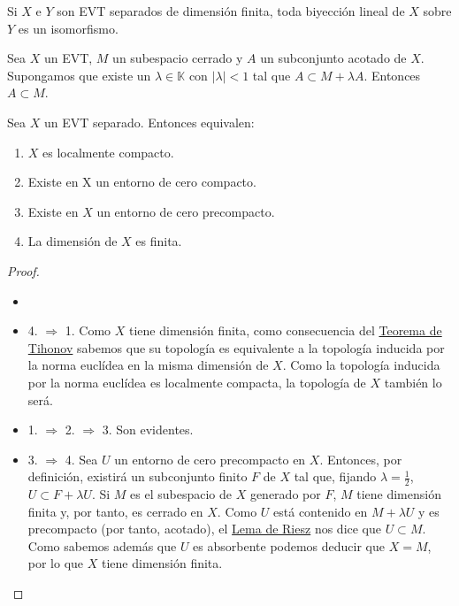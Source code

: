 \begin{teorema}\label{thm:d05}
Si $X$ e $Y$ son EVT separados de dimensión finita, toda biyección lineal de $X$ sobre $Y$ es un isomorfismo. 
\end{teorema}

\begin{lema}\label{lm:d01}
Sea $X$ un EVT, $M$ un subespacio cerrado y $A$ un subconjunto acotado de $X$. Supongamos que existe un $\lambda\in \mathds{K}$ con $|\lambda| <1$ tal que $A\subset M + \lambda A$. Entonces $A\subset M$. 
\end{lema}
\begin{teorema}\label{thm:d04}
Sea $X$ un EVT separado. Entonces equivalen:
\begin{enumerate}


\item $X$ es localmente compacto.
\item Existe en X un entorno de cero compacto.
\item Existe en $X$ un entorno de cero precompacto.
\item La dimensión de $X$ es finita.
\end{enumerate}
\end{teorema}
\begin{proof}
\begin{itemize}
\item[]
\item 4. $\Rightarrow$ 1. Como $X$ tiene dimensión finita, como consecuencia del \hyperref[thm:d05]{Teorema de Tihonov} sabemos que su topología es equivalente a la topología inducida por la norma euclídea en la misma dimensión de $X$. Como la topología inducida por la norma euclídea es localmente compacta, la topología de $X$ también lo será. 
\item 1. $\Rightarrow$ 2. $\Rightarrow$ 3. Son evidentes.
\item 3. $\Rightarrow$ 4. Sea $U$ un entorno de cero precompacto en $X$. Entonces, por definición, existirá un subconjunto finito $F$ de $X$ tal que, fijando $\lambda=\frac{1}{2}$, $U\subset F + \lambda U$. Si $M$ es el subespacio de $X$ generado por $F$, $M$ tiene dimensión finita y, por tanto, es cerrado en $X$. Como $U$ está contenido en $M+\lambda U$ y es precompacto (por tanto, acotado), el \hyperref[lm:d01]{Lema de Riesz} nos dice que $U\subset M$. Como sabemos además que $U$ es absorbente podemos deducir que $X=M$, por lo que $X$ tiene dimensión finita. 
\end{itemize}
\end{proof}

